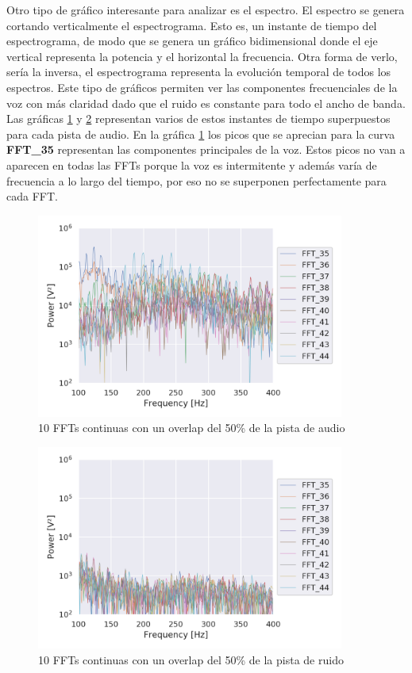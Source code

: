Otro tipo de gráfico interesante para analizar es el espectro. El espectro se genera cortando verticalmente el espectrograma. Esto es, un instante de tiempo del espectrograma, de modo que se genera un gráfico bidimensional donde el eje vertical representa la potencia y el horizontal la frecuencia. Otra forma de verlo, sería la inversa, el espectrograma representa la evolución temporal de todos los espectros. Este tipo de gráficos permiten ver las componentes frecuenciales de la voz con más claridad dado que el ruido es constante para todo el ancho de banda. Las gráficas \ref{fig: ffts_audio} y \ref{fig: ffts_noise} representan varios de estos instantes de tiempo superpuestos para cada pista de audio. En la gráfica \ref{fig: ffts_audio} los picos que se aprecian para la curva \textbf{FFT\_35} representan las componentes principales de la voz. Estos picos no van a aparecen en todas las \glspl{FFT} porque la voz es intermitente y además varía de frecuencia a lo largo del tiempo, por eso no se superponen perfectamente para cada \gls{FFT}.

\begin{figure}[h!]
	\centering
	\includegraphics[width=0.9\textwidth]{figures/audio_ffts}
	\caption{10 \acrshort{FFT}s continuas con un overlap del 50\% de la pista de audio}
	\label{fig: ffts_audio}
\end{figure}
\begin{figure}[h!]
	\centering
	\includegraphics[width=0.9\textwidth]{figures/noise_ffts}
	\caption{10 \acrshort{FFT}s continuas con un overlap del 50\% de la pista de ruido}
	\label{fig: ffts_noise}
\end{figure}

